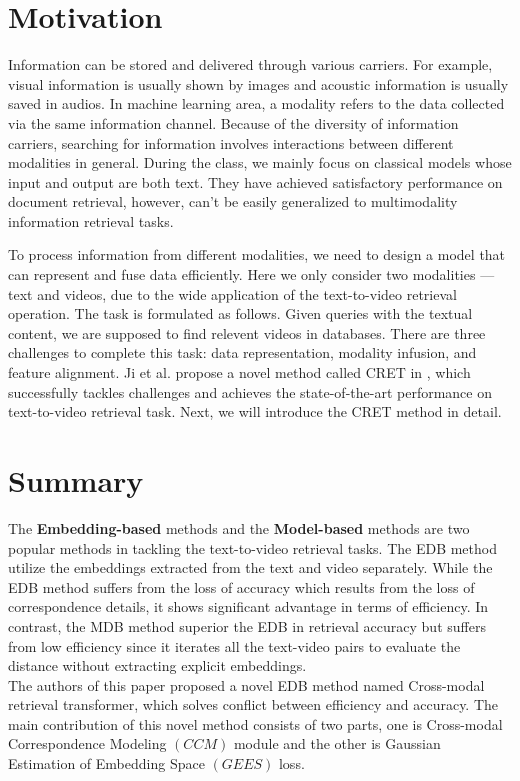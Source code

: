 \documentclass{article}
\begin{document}
\section{Motivation}
Information can be stored and delivered through various carriers. For example, visual information is usually shown by images and acoustic information is usually saved in audios. In machine learning area, a modality refers to the data collected via the same information channel. Because of the diversity of information carriers, searching for information involves interactions between different modalities in general. During the class, we mainly focus on classical models whose input and output are both text. They have achieved satisfactory performance on document retrieval, however, can't be easily generalized to multimodality information retrieval tasks.

To process information from different modalities, we need to design a model that can represent and fuse data efficiently. Here we only consider two modalities --- text and videos, due to the wide application of the text-to-video retrieval operation. The task is formulated as follows. Given queries with the textual content, we are supposed to find relevent videos in databases. There are three challenges to complete this task: data representation, modality infusion, and feature alignment. Ji et al. propose a novel method called CRET in \cite{cret}, which successfully tackles challenges and achieves the state-of-the-art performance on text-to-video retrieval task. Next, we will introduce the CRET method in detail.

\section{Summary}
The \textbf{Embedding-based} methods and the \textbf{Model-based} methods are two popular methods in tackling the text-to-video retrieval tasks. The EDB method utilize the embeddings extracted from the text and video separately. While the EDB method suffers from the loss of accuracy which results from the loss of correspondence details, it shows significant advantage in terms of efficiency. In contrast, the MDB method superior the EDB in retrieval accuracy but suffers from low efficiency since it iterates all the text-video pairs to evaluate the distance without extracting explicit embeddings.\\

The authors of this paper proposed a novel EDB method named Cross-modal retrieval transformer, which solves conflict between efficiency and accuracy. The main contribution of this novel method consists of two parts, one is Cross-modal Correspondence Modeling $(CCM)$  module and the other is Gaussian Estimation of Embedding Space $(GEES)$ loss. \\
\end{document}
